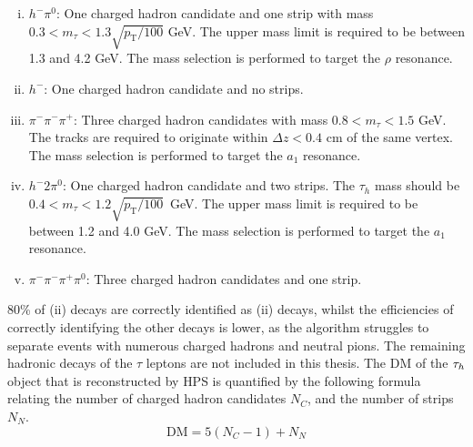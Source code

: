 \begin{enumerate}[i)]
\item $h^- \pi^0$: One charged hadron candidate and one strip with mass $ 0.3 < m_{\tau} < 1.3 \sqrt{p_{\text{T}}/100}$ GeV. The upper mass limit is required to be between 1.3 and 4.2 GeV. The mass selection is performed to target the $\rho$ resonance.
\item $h^-$: One charged hadron candidate and no strips.
\item $\pi^- \pi^- \pi^+$: Three charged hadron candidates with mass $0.8 < m_{\tau} < 1.5$ GeV. The tracks are required to originate within $\Delta z<0.4$ cm of the same vertex. The mass selection is performed to target the $a_1$ resonance.
\item $h^- 2\pi^0$: One charged hadron candidate and two strips. The $\tau_{h}$ mass should be $0.4 < m_{\tau} < 1.2\sqrt{p_{\text{T}}/100}$~GeV. The upper mass limit is required to be between 1.2 and 4.0 GeV. The mass selection is performed to target the $a_1$ resonance.
\item $\pi^- \pi^- \pi^+ \pi^0$: Three charged hadron candidates and one strip.
\end{enumerate}

80\% of (ii) decays are correctly identified as (ii) decays, whilst the efficiencies of correctly identifying the other decays is lower, as the algorithm struggles to separate events with numerous charged hadrons and neutral pions.
The remaining hadronic decays of the $\tau$ leptons are not included in this thesis.
The \ac{DM} of the $\tau_{h}$ object that is reconstructed by \ac{HPS} is quantified by the following formula relating the number of charged hadron candidates $N_C$, and the number of strips $N_N$.
\begin{equation}
\text{DM} = 5(N_{C} - 1) + N_{N}
\end{equation}

